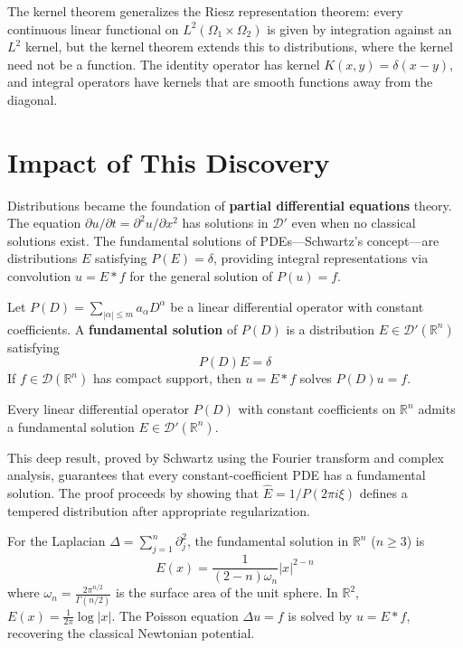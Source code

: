 The kernel theorem generalizes the Riesz representation theorem: every continuous linear functional on $L^2(\Omega_1 \times \Omega_2)$ is given by integration against an $L^2$ kernel, but the kernel theorem extends this to distributions, where the kernel need not be a function. The identity operator has kernel $K(x,y) = \delta(x-y)$, and integral operators have kernels that are smooth functions away from the diagonal.

\section{Impact of This Discovery}

Distributions became the foundation of \textbf{partial differential equations} theory. The equation $\partial u / \partial t = \partial^2 u / \partial x^2$ has solutions in $\mathcal{D}'$ even when no classical solutions exist. The fundamental solutions of PDEs---Schwartz's concept---are distributions $E$ satisfying $P(E) = \delta$, providing integral representations via convolution $u = E * f$ for the general solution of $P(u) = f$.

\begin{definition}
Let $P(D) = \sum_{|\alpha| \leq m} a_\alpha D^\alpha$ be a linear differential operator with constant coefficients. A \textbf{fundamental solution} of $P(D)$ is a distribution $E \in \mathcal{D}'(\mathbb{R}^n)$ satisfying
\[P(D)E = \delta\]
If $f \in \mathcal{D}(\mathbb{R}^n)$ has compact support, then $u = E * f$ solves $P(D)u = f$.
\end{definition}

\begin{theorem}
Every linear differential operator $P(D)$ with constant coefficients on $\mathbb{R}^n$ admits a fundamental solution $E \in \mathcal{D}'(\mathbb{R}^n)$.
\end{theorem}

This deep result, proved by Schwartz using the Fourier transform and complex analysis, guarantees that every constant-coefficient PDE has a fundamental solution. The proof proceeds by showing that $\hat{E} = 1/P(2\pi i \xi)$ defines a tempered distribution after appropriate regularization.

For the Laplacian $\Delta = \sum_{j=1}^n \partial_j^2$, the fundamental solution in $\mathbb{R}^n$ ($n \geq 3$) is
\[E(x) = \frac{1}{(2-n)\omega_n} |x|^{2-n}\]
where $\omega_n = \frac{2\pi^{n/2}}{\Gamma(n/2)}$ is the surface area of the unit sphere. In $\mathbb{R}^2$, $E(x) = \frac{1}{2\pi} \log|x|$. The Poisson equation $\Delta u = f$ is solved by $u = E * f$, recovering the classical Newtonian potential.

